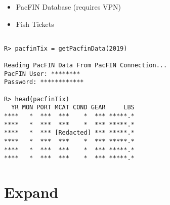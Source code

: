 \documentclass[ xcolor = pdftex, dvipsnames, table ]{beamer}
\begin{document}
\begin{frame}[fragile]
\begin{minipage}[h!]{0.44\textwidth}
\begin{itemize}
	\setlength\itemsep{1em}
	\item PacFIN Database (requires VPN)
	\item Fish Tickets
\end{itemize}
\end{minipage}
\begin{minipage}[h!]{0.54\textwidth}
{\scriptsize
\begin{Verbatim}

R> pacfinTix = getPacfinData(2019)

Reading PacFIN Data From PacFIN Connection...
PacFIN User: ********
Password: ************

R> head(pacfinTix)
  YR MON PORT MCAT COND GEAR     LBS
****   *  ***  ***    *  *** *****.*    
****   *  ***  ***    *  *** *****.*
****   *  *** [Redacted] *** *****.*
****   *  ***  ***    *  *** *****.*
****   *  ***  ***    *  *** *****.*
****   *  ***  ***    *  *** *****.*
\end{Verbatim}
}
\end{minipage}
\end{frame}


%
\section{Expand}
\subsection{}

%
\begin{frame}
\end{frame}
\end{document}
